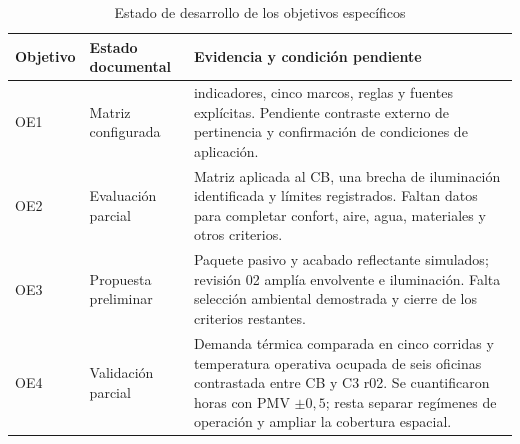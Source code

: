 \begin{table}[H]\centering
\caption{Estado de desarrollo de los objetivos específicos}
{\small\singlespacing\renewcommand{\arraystretch}{1.3}\setlength{\tabcolsep}{4pt}
\begin{tabular}{>{\raggedright\arraybackslash}p{1.6cm}>{\raggedright\arraybackslash}p{3.2cm}>{\raggedright\arraybackslash}p{9.1cm}}\toprule
Objetivo & Estado documental & Evidencia y condición pendiente \\ \midrule
OE1 & Matriz configurada & 16 indicadores, cinco marcos, reglas y fuentes explícitas. Pendiente contraste externo de pertinencia y confirmación de condiciones de aplicación. \\
OE2 & Evaluación parcial & Matriz aplicada al CB, una brecha de iluminación identificada y límites registrados. Faltan datos para completar confort, aire, agua, materiales y otros criterios. \\
OE3 & Propuesta preliminar & Paquete pasivo y acabado reflectante simulados; revisión 02 amplía envolvente e iluminación. Falta selección ambiental demostrada y cierre de los criterios restantes. \\
OE4 & Validación parcial & Demanda térmica comparada en cinco corridas y temperatura operativa ocupada de seis oficinas contrastada entre CB y C3 r02. Se cuantificaron horas con PMV $\pm0,5$; resta separar regímenes de operación y ampliar la cobertura espacial. \\
\bottomrule\end{tabular}}
\end{table}
